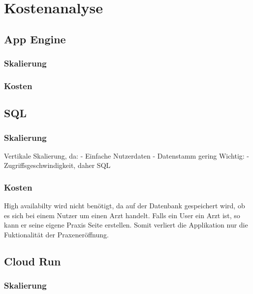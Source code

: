 \chapter{Kostenanalyse}
\label{cha:kostenanalyse}



\section{App Engine}
\blindtext

\subsection*{Skalierung}
\blindtext

\subsection*{Kosten}
\sblindtext


\section{SQL}
\blindtext

\subsection*{Skalierung}
\blindtext
Vertikale Skalierung, da:
 - Einfache Nutzerdaten
 - Datenstamm gering
Wichtig:
 - Zugriffsgeschwindigkeit, daher SQL



\subsection*{Kosten}
High availabilty wird nicht benötigt, da auf der Datenbank gespeichert wird, ob es sich bei einem Nutzer um einen Arzt handelt.
Falls ein User ein Arzt ist, so kann er seine eigene Praxis Seite erstellen.
Somit verliert die Applikation nur die Fuktionalität der Praxeneröffnung.
\sblindtext


\section{Cloud Run}
\blindtext

\subsection*{Skalierung}
\blindtext

